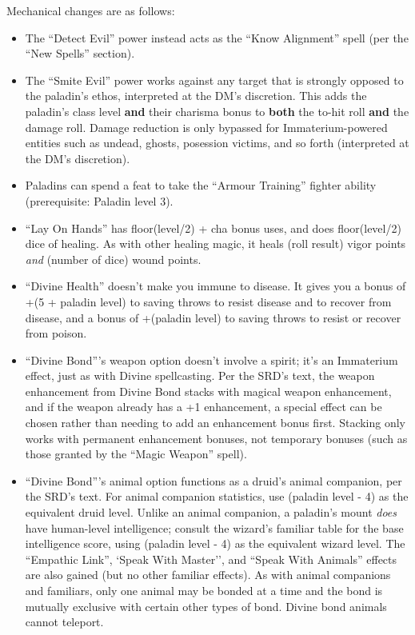 Mechanical changes are as follows:

\begin{itemize}
%
\item The ``Detect Evil'' power instead acts as the ``Know Alignment''
spell (per the ``New Spells'' section).
%
\item The ``Smite Evil'' power works against any target that is strongly
opposed to the paladin's ethos, interpreted at the DM's discretion. This
adds the paladin's class level \textbf{and} their charisma bonus to
\textbf{both} the to-hit roll \textbf{and} the damage roll. Damage reduction
is only bypassed for Immaterium-powered entities such as undead, ghosts,
posession victims, and so forth (interpreted at the DM's discretion).
%
\item Paladins can spend a feat to take the ``Armour Training'' fighter
ability (prerequisite: Paladin level 3).
%
\item ``Lay On Hands'' has floor(level/2) + cha bonus uses, and does
floor(level/2) dice of healing. As with other healing magic, it heals
(roll result) vigor points \textit{and} (number of dice) wound points.
%
\item ``Divine Health'' doesn't make you immune to disease. It gives you
a bonus of +(5 + paladin level) to saving throws to resist disease and to
recover from disease, and a bonus of +(paladin level) to saving throws to
resist or recover from poison.
%
\item ``Divine Bond'''s weapon option doesn't involve a spirit; it's an
Immaterium effect, just as with Divine spellcasting. Per the SRD's text,
the weapon enhancement from Divine Bond stacks with magical weapon
enhancement, and if the weapon already has a +1 enhancement, a special
effect can be chosen rather than needing to add an enhancement bonus first.
Stacking only works with permanent enhancement bonuses, not temporary
bonuses (such as those granted by the ``Magic Weapon'' spell).
%
\item ``Divine Bond'''s animal option functions as a druid's animal
companion, per the SRD's text. For animal companion statistics, use
(paladin level - 4) as the equivalent druid level. Unlike an animal
companion, a paladin's mount \textit{does} have human-level intelligence;
consult the wizard's familiar table for the base intelligence score, using
(paladin level - 4) as the equivalent wizard level. The ``Empathic Link'',
`Speak With Master'', and ``Speak With Animals'' effects are also gained (but
no other familiar effects). As with animal companions and familiars, only
one animal may be bonded at a time and the bond is mutually exclusive with
certain other types of bond. Divine bond animals cannot teleport.
%
\end{itemize}

